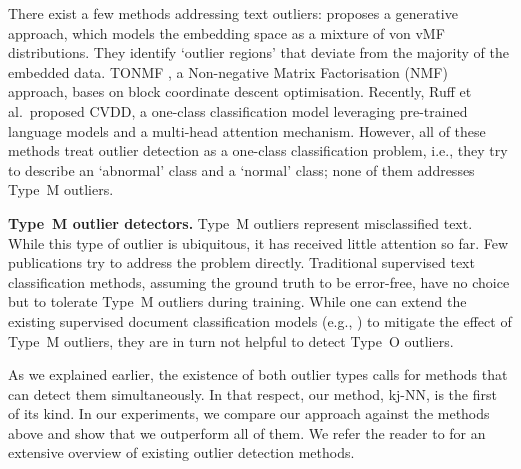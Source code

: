 There exist a few methods addressing text outliers: \cite{DBLP:conf/emnlp/ZhuangWTKH17} proposes a generative approach, which models the embedding space as a mixture of von \gls{vMF} distributions. They identify `outlier regions' that deviate from the majority of the embedded data. \acrshort{TONMF} \cite{DBLP:conf/sdm/KannanWAP17}, a Non-negative Matrix Factorisation (NMF) approach, bases on block coordinate descent optimisation. 
Recently, Ruff et al.\ proposed \gls{CVDD}, a one-class classification model leveraging pre-trained language models and a multi-head attention mechanism. However, all of these methods treat outlier detection as a one-class classification problem, i.e., they try to describe an `abnormal' class and a `normal' class; none of them addresses Type~M outliers. 

\textbf{Type~M outlier detectors.} Type~M outliers represent misclassified text. While this type of outlier is ubiquitous, it has received little attention so far. 
Few publications try to address the problem directly. 
Traditional supervised text classification methods, assuming the ground truth to be error-free, have no choice but to tolerate Type~M outliers during training. 
While one can extend the existing supervised document classification models (e.g., \cite{DBLP:conf/emnlp/Kim14, DBLP:conf/eacl/SchwenkBCL17, DBLP:conf/acl/ZhouSTQLHX16, DBLP:conf/aaai/LaiXLZ15}) to mitigate the effect of Type~M outliers, they are in turn not helpful to detect Type~O outliers. 

As we explained earlier, the existence of both outlier types calls for methods that can detect them simultaneously. In that respect, our method, \gls{kj-NN}, is the first of its kind. In our experiments, we compare our approach against the methods above and show that we outperform all of them. We refer the reader to \cite{DBLP:books/sp/Aggarwal2013} for an extensive overview of existing outlier detection methods. 

